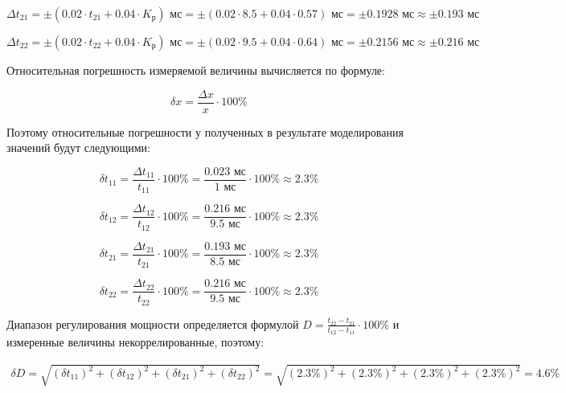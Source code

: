 \begin{displaymath}
	\Delta t_{21} = \pm \left( 0.02 \cdot t_{21} + 0.04 \cdot K_{\text{р}} \right) \text{ мс} = \pm \left( 0.02 \cdot 8.5 + 0.04 \cdot 0.57 \right) \text{ мс} = \pm 0.1928 \text{ мс} \approx \pm 0.193 \text{ мс}  
\end{displaymath}

\begin{displaymath}
	\Delta t_{22} = \pm \left( 0.02 \cdot t_{22} + 0.04 \cdot K_{\text{р}} \right) \text{ мс} = \pm \left( 0.02 \cdot 9.5 + 0.04 \cdot 0.64 \right) \text{ мс} = \pm 0.2156 \text{ мс} \approx \pm 0.216 \text{ мс}  
\end{displaymath}

Относительная погрешность измеряемой величины вычисляется по формуле:

\begin{equation}
	\delta x = \frac{\Delta x}{x} \cdot 100\%
\end{equation}

Поэтому относительные погрешности у полученных в результате моделирования значений будут следующими:

\begin{displaymath}
	\delta t_{11} = \frac{\Delta t_{11}}{t_{11}} \cdot 100\% = \frac{0.023 \text{ мс}}{1 \text{ мс}} \cdot 100\% \approx 2.3 \%
\end{displaymath}

\begin{displaymath}
	\delta t_{12} = \frac{\Delta t_{12}}{t_{12}} \cdot 100\% = \frac{0.216 \text{ мс}}{9.5 \text{ мс}} \cdot 100\% \approx 2.3 \%
\end{displaymath}

\begin{displaymath}
	\delta t_{21} = \frac{\Delta t_{21}}{t_{21}} \cdot 100\% = \frac{0.193 \text{ мс}}{8.5 \text{ мс}} \cdot 100\% \approx 2.3 \%
\end{displaymath}

\begin{displaymath}
	\delta t_{22} = \frac{\Delta t_{22}}{t_{22}} \cdot 100\% = \frac{0.216 \text{ мс}}{9.5 \text{ мс}} \cdot 100\% \approx 2.3 \%
\end{displaymath}

Диапазон регулирования мощности определяется формулой $D = \frac{t_{22} - t_{21}}{t_{12} - t_{11}} \cdot 100\%$ и измеренные величины некоррелированные, поэтому:

\begin{displaymath}
\begin{aligned}
	\delta D = \sqrt{(\delta t_{11})^2 + (\delta t_{12})^2 +(\delta t_{21})^2 +(\delta t_{22})^2} = \sqrt{(2.3\%)^2 + (2.3\%)^2 +(2.3\%)^2 +(2.3\%)^2} = 4.6 \%
\end{aligned}
\end{displaymath}

